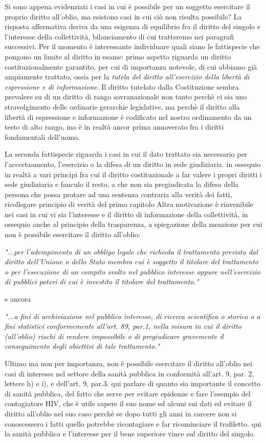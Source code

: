 Si sono appena evidenziati i casi in cui è possibile per un soggetto esercitare il proprio diritto all'oblio, ma esistono casi in cui ciò non risulta possibile? 
La risposta affermativa deriva da una esigenza di equilibrio fra il diritto del singolo e l'interesse della collettività, bilanciamento di cui tratteremo nei paragrafi successivi. 
Per il momento è interessante individuare quali siano le fattispecie che pongono un limite al diritto in esame: primo aspetto riguarda un diritto costituzionalmente garantito, per cui di importanza notevole, di cui abbiamo già ampiamente trattato, ossia per la\textit{ tutela del diritto all'esercizio della libertà di espressione e di informazione}. Il diritto tutelato dalla Costituzione sembra prevalere su di un diritto di rango sovranazionale non tanto perchè ci sia uno stravolgimento delle ordinarie gerarchie legislative, ma perchè il diritto alla libertà di espressione e informazione è codificato nel nostro ordinamento da un testo di alto rango, ma è in realtà ancor prima annoverato fra i diritti fondamentali dell'uomo. 

La seconda fattispecie riguarda i casi in cui il dato trattato sia necessario per l'accertaamento, l'esercizio o la difesa di un diritto in sede giudiziaria. 
in ossequio in realtà a vari principi fra cui il diritto costituzionale a far valere i propri diritti i sede giudiziaria e fanculo il resto, a che non sia pregiudicata la difesa della persona che possa protare ad una sentenza contraria alla verità dei fatti, ricollegare principio di verità del primo capitolo
Altra motivazione è rinvenibile nei casi in cui vi sia l'interesse e il diritto di informazione della collettività, in ossequio anche al principio della trasparenza, a spiegazione della menzione per cui non è possibile esercitare il diritto all'oblio:

\textit{"...per l'adempimento di un obbligo legale che richieda il trattamento previsto dal diritto dell'Unione o dello Stato membro cui è soggetto il titolare del trattamento o per l'esecuzione di un compito svolto nel pubblico interesse oppure nell'esercizio di pubblici poteri di cui è investito il titolare del trattamento."}

e ancora

\textit{"...a fini di archiviazione nel pubblico interesse, di ricerca scientifica o storica o a fini statistici conformemente all'art. 89, par.1, nella misura in cui il diritto (all'oblio) rischi di rendere impossibile o di pregiudicare gravemente il conseguimento degli obiettivi di tale trattamento."}

Ultimo ma non per importanza, non è possibile esercitare il diritto all'oblio nei casi di interesse nel settore della sanità pubblica in conformità all'art. 9, par. 2, lettere h) e i), e dell'art. 9, par.3.
qui parlare di quanto sia importante il concetto di sanità pubblica, del fatto che serve per evitare epidemie e fare l'esempio del contagiatore HIV, che è utile sapere il suo nome ed alcuni sui dati ed evitare il diritto all'oblio nel suo caso perchè se dopo tutti gli anni in carcere non si conoscessero i fatti quello potrebbe ricontagiare e far ricominciare il trafiletto. qui la sanità pubblica e l'interesse per il bene superiore vince sul diritto del singolo.

